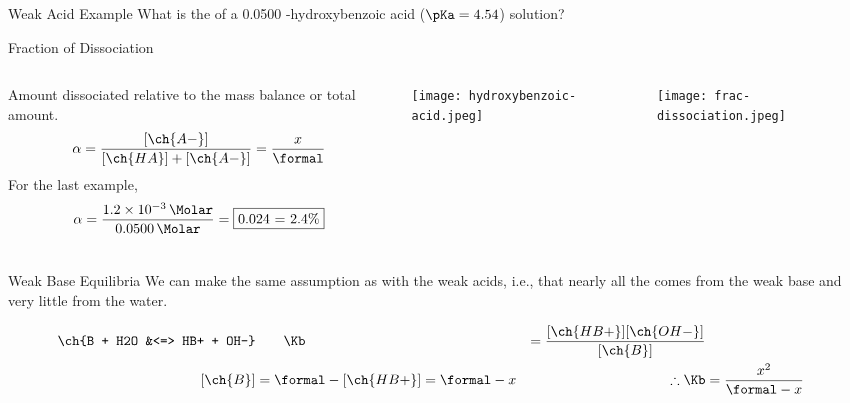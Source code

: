 \documentclass[notes=hide]{beamer}
\begin{document}
\begin{frame}[t]{Weak Acid Example}
	What is the \pH{} of a \SI{0.0500}{\Molar} \para-hydroxybenzoic acid ($\pKa =
	4.54$) solution?

\end{frame}

\clearpage

\begin{frame}{Fraction of Dissociation}
	\begin{columns}
		Amount dissociated relative to the mass balance or total amount.
		\begin{align*}
			\alpha = \frac{[\ch{A-}]}{[\ch{HA}] + [\ch{A-}]} =
			\frac{x}{\si{\formal}}
		\end{align*}
		For the last example,
		\begin{align*}
			\alpha =
			\frac{\SI{1.2e-3}{\Molar}}{\SI{0.0500}{\Molar}} =
			\fbox{0.024 = 2.4\%}
		\end{align*}
		\begin{center}
			\texttt{[image: hydroxybenzoic-acid.jpeg]}
		\end{center}
		\begin{center}
			\texttt{[image: frac-dissociation.jpeg]}
		\end{center}
	\end{columns}
\end{frame}

\begin{frame}{Weak Base Equilibria}
	We can make the same assumption as with the weak acids, i.e., that
	nearly all the  comes from the weak base and very little from
	the water.

	\begin{align*}
		\ch{B + H2O &<=> HB+ + OH-} &\qquad \Kb &=
		\frac{[\ch{HB+}][\ch{OH-}]}{[\ch{B}]} \\
		[\ch{B}] &= \si{\formal} - [\ch{HB+}] = \si{\formal} - x &\qquad
		\therefore \Kb &= \frac{x^2}{\si{\formal}-x}
	\end{align*}
\end{frame}
\end{document}
